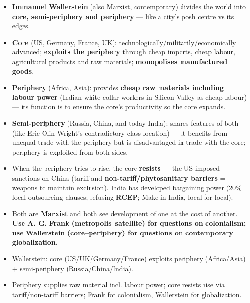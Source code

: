 \begin{KeyConcept}
\begin{itemize}
    \item \textbf{Immanuel Wallerstein} (also Marxist, contemporary) divides the world into \textbf{core, semi-periphery and periphery} --- like a city's posh centre vs its edges.
    \item \textbf{Core} (US, Germany, France, UK): technologically/militarily/economically advanced; \textbf{exploits the periphery} through cheap imports, cheap labour, agricultural products and raw materials; \textbf{monopolises manufactured goods}.
    \item \textbf{Periphery} (Africa, Asia): provides \textbf{cheap raw materials including labour power} (Indian white-collar workers in Silicon Valley as cheap labour) --- its function is to ensure the core's productivity so the core expands.
    \item \textbf{Semi-periphery} (Russia, China, and today India): shares features of both (like Eric Olin Wright's contradictory class location) --- it benefits from unequal trade with the periphery but is disadvantaged in trade with the core; periphery is exploited from both sides.
\end{itemize}
\end{KeyConcept}

\begin{CriticalPoint}
\begin{itemize}
    \item When the periphery tries to rise, the core \textbf{resists} --- the US imposed sanctions on China (tariff and \textbf{non-tariff/phytosanitary barriers} = weapons to maintain exclusion). India has developed bargaining power (20\% local-outsourcing clauses; refusing \textbf{RCEP}; Make in India, local-for-local).
\end{itemize}
\end{CriticalPoint}

\begin{ComparisonBox}
\begin{itemize}
    \item Both are \textbf{Marxist} and both see development of one at the cost of another. \textbf{Use A. G. Frank (metropolis--satellite) for questions on colonialism; use Wallerstein (core--periphery) for questions on contemporary globalization.}
\end{itemize}
\end{ComparisonBox}

\begin{QuickRevision}
\begin{itemize}
    \item Wallerstein: core (US/UK/Germany/France) exploits periphery (Africa/Asia) + semi-periphery (Russia/China/India).
    \item Periphery supplies raw material incl. labour power; core resists rise via tariff/non-tariff barriers; Frank for colonialism, Wallerstein for globalization.
\end{itemize}
\end{QuickRevision}

